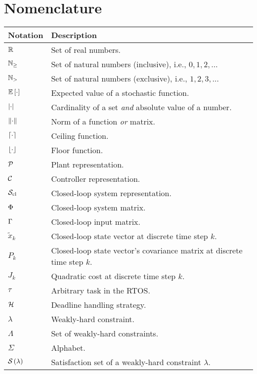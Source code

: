 \chapter*{Nomenclature}%
%
\vspace{-1.75cm}

\begin{table*}[h]
    \centering
    \begin{tabular}{l|l}%
        \textbf{Notation} & \textbf{Description} \\\hline
        $\mathbb{R}$ & Set of real numbers. \\
        $\mathbb{N}_{\geq}$ & Set of natural numbers (inclusive), i.e., $0, 1, 2, \ldots$ \\
        $\mathbb{N}_{>}$ & Set of natural numbers (exclusive), i.e., $1, 2, 3, \ldots$ \\
        $\mathbb{E}\left[ \cdot \right]$ & Expected value of a stochastic function. \\
        $\left|\cdot\right|$ & Cardinality of a set \emph{and} absolute value of a number. \\
        $\lVert\cdot\rVert$ & Norm of a function \emph{or} matrix. \\
        $\lceil\cdot\rceil$ & Ceiling function. \\
        $\lfloor\cdot\rfloor$ & Floor function. \\
        $\mathcal{P}$ & Plant representation. \\
        $\mathcal{C}$ & Controller representation. \\
        $\mathcal{S}_{\text{cl}}$ & Closed-loop system representation. \\
        $\Phi$ & Closed-loop system matrix. \\
        $\Gamma$ & Closed-loop input matrix. \\
        $\tilde{x}_k$ & Closed-loop state vector at discrete time step $k$. \\
        $P_k$ & Closed-loop state vector's covariance matrix at discrete time step $k$. \\
        $J_k$ & Quadratic cost at discrete time step $k$. \\
        $\tau$ & Arbitrary task in the RTOS. \\
        $\mathcal{H}$ & Deadline handling strategy. \\
        $\lambda$ & Weakly-hard constraint. \\
        $\Lambda$ & Set of weakly-hard constraints. \\
        $\Sigma$ & Alphabet. \\
        $\mathcal{S}_{}\left( \lambda \right)$ & Satisfaction set of a weakly-hard constraint $\lambda$. \\

\end{tabular}
\end{table*}
